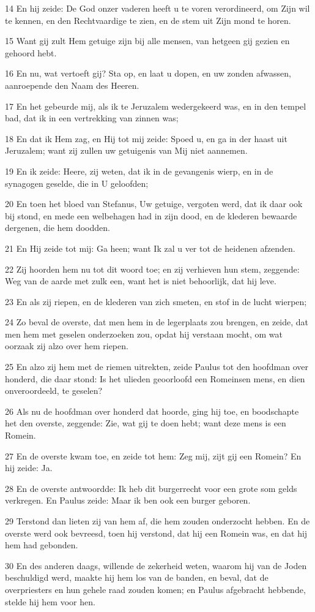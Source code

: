 \par 14 En hij zeide: De God onzer vaderen heeft u te voren verordineerd, om Zijn wil te kennen, en den Rechtvaardige te zien, en de stem uit Zijn mond te horen.
\par 15 Want gij zult Hem getuige zijn bij alle mensen, van hetgeen gij gezien en gehoord hebt.
\par 16 En nu, wat vertoeft gij? Sta op, en laat u dopen, en uw zonden afwassen, aanroepende den Naam des Heeren.
\par 17 En het gebeurde mij, als ik te Jeruzalem wedergekeerd was, en in den tempel bad, dat ik in een vertrekking van zinnen was;
\par 18 En dat ik Hem zag, en Hij tot mij zeide: Spoed u, en ga in der haast uit Jeruzalem; want zij zullen uw getuigenis van Mij niet aannemen.
\par 19 En ik zeide: Heere, zij weten, dat ik in de gevangenis wierp, en in de synagogen geselde, die in U geloofden;
\par 20 En toen het bloed van Stefanus, Uw getuige, vergoten werd, dat ik daar ook bij stond, en mede een welbehagen had in zijn dood, en de klederen bewaarde dergenen, die hem doodden.
\par 21 En Hij zeide tot mij: Ga heen; want Ik zal u ver tot de heidenen afzenden.
\par 22 Zij hoorden hem nu tot dit woord toe; en zij verhieven hun stem, zeggende: Weg van de aarde met zulk een, want het is niet behoorlijk, dat hij leve.
\par 23 En als zij riepen, en de klederen van zich smeten, en stof in de lucht wierpen;
\par 24 Zo beval de overste, dat men hem in de legerplaats zou brengen, en zeide, dat men hem met geselen onderzoeken zou, opdat hij verstaan mocht, om wat oorzaak zij alzo over hem riepen.
\par 25 En alzo zij hem met de riemen uitrekten, zeide Paulus tot den hoofdman over honderd, die daar stond: Is het ulieden geoorloofd een Romeinsen mens, en dien onveroordeeld, te geselen?
\par 26 Als nu de hoofdman over honderd dat hoorde, ging hij toe, en boodschapte het den overste, zeggende: Zie, wat gij te doen hebt; want deze mens is een Romein.
\par 27 En de overste kwam toe, en zeide tot hem: Zeg mij, zijt gij een Romein? En hij zeide: Ja.
\par 28 En de overste antwoordde: Ik heb dit burgerrecht voor een grote som gelds verkregen. En Paulus zeide: Maar ik ben ook een burger geboren.
\par 29 Terstond dan lieten zij van hem af, die hem zouden onderzocht hebben. En de overste werd ook bevreesd, toen hij verstond, dat hij een Romein was, en dat hij hem had gebonden.
\par 30 En des anderen daags, willende de zekerheid weten, waarom hij van de Joden beschuldigd werd, maakte hij hem los van de banden, en beval, dat de overpriesters en hun gehele raad zouden komen; en Paulus afgebracht hebbende, stelde hij hem voor hen.

